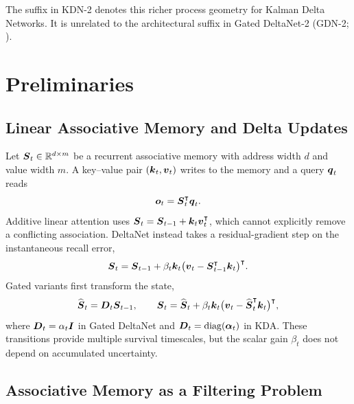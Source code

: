\documentclass[11pt,letterpaper,logo]{yalearxiv}
\begin{document}
The suffix in KDN-2 denotes this richer process geometry for Kalman Delta Networks. It is unrelated
to the architectural suffix in Gated DeltaNet-2 (GDN-2;
\citealp{hatamizadeh2026gdn2}).


\section{Preliminaries}
\label{sec:preliminaries-kdn2}

\subsection{Linear Associative Memory and Delta Updates}
\label{sec:linear-memory-kdn2}

Let $\boldsymbol{S}_t\in\mathbb{R}^{d\times m}$ be a recurrent associative memory with address width $d$ and
value width $m$. A key--value pair $(\boldsymbol{k}_t,\boldsymbol{v}_t)$ writes to the memory and a query
$\boldsymbol{q}_t$ reads
\begin{equation}
  \boldsymbol{o}_t=\boldsymbol{S}_t^{\intercal}\boldsymbol{q}_t.
  \label{eq:kdn2-read}
\end{equation}
Additive linear attention uses
$\boldsymbol{S}_t=\boldsymbol{S}_{t-1}+\boldsymbol{k}_t\boldsymbol{v}_t^{\intercal}$, which cannot explicitly remove a conflicting
association. DeltaNet instead takes a residual-gradient step on the instantaneous recall error,
\begin{equation}
  \boldsymbol{S}_t
  =
  \boldsymbol{S}_{t-1}
  +\beta_t\boldsymbol{k}_t
   \big(\boldsymbol{v}_t-\boldsymbol{S}_{t-1}^{\intercal}\boldsymbol{k}_t\big)^{\intercal}.
  \label{eq:kdn2-delta}
\end{equation}
Gated variants first transform the state,
\begin{equation}
  \widehat{\boldsymbol{S}}_t=\boldsymbol{D}_t\boldsymbol{S}_{t-1},
  \qquad
  \boldsymbol{S}_t
  =
  \widehat{\boldsymbol{S}}_t
  +\beta_t\boldsymbol{k}_t
   \big(\boldsymbol{v}_t-\widehat{\boldsymbol{S}}_t^{\intercal}\boldsymbol{k}_t\big)^{\intercal},
  \label{eq:kdn2-gated-delta}
\end{equation}
where $\boldsymbol{D}_t=\alpha_t\boldsymbol{I}$ in Gated DeltaNet and
$\boldsymbol{D}_t=\operatorname{diag}(\boldsymbol{\alpha}_t)$ in KDA. These transitions provide multiple survival timescales,
but the scalar gain $\beta_t$ does not depend on accumulated uncertainty.

\subsection{Associative Memory as a Filtering Problem}
\label{sec:filtering-problem-kdn2}
\end{document}
